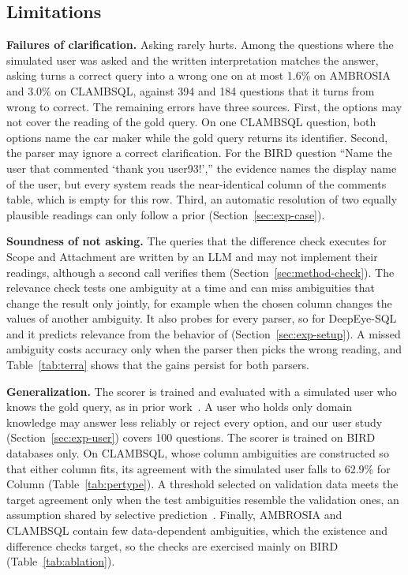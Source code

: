 \subsection{Limitations}
\label{sec:discussion}


\textbf{Failures of clarification.}\label{sec:exp-fail} Asking rarely
hurts. Among the questions where the simulated user was asked and the
written interpretation matches the answer, asking turns a correct
query into a wrong one on at most 1.6\% on AMBROSIA and 3.0\% on
CLAMBSQL, against 394 and 184 questions that it turns from wrong to
correct. The remaining errors have three sources. First, the options
may not cover the reading of the gold query. On one CLAMBSQL question,
both options name the car maker while the gold query returns its
identifier. Second, the parser may ignore a correct clarification. For
the BIRD question ``Name the user that commented `thank you
user93!','' the evidence names the display name of the user, but every
system reads the near-identical column of the comments table, which is
empty for this row. Third, an automatic resolution of two equally
plausible readings can only follow a prior
(Section~\ref{sec:exp-case}).

\textbf{Soundness of not asking.} The queries that the difference
check executes for Scope and Attachment are written by an LLM and may
not implement their readings, although a second call verifies them
(Section~\ref{sec:method-check}). The relevance check tests one
ambiguity at a time and can miss ambiguities that change the result
only jointly, for example when the chosen column changes the values of
another ambiguity. It also probes \coder{} for every parser, so for
DeepEye-SQL and \terra{} it predicts relevance from the behavior of
\coder{} (Section~\ref{sec:exp-setup}). A missed ambiguity costs
accuracy only when the parser then picks the wrong reading, and
Table~\ref{tab:terra} shows that the gains persist for both parsers.

\textbf{Generalization.} The scorer is trained and evaluated with a
simulated user who knows the gold query, as in prior
work~\cite{zhang2025clear,xu2026visinteract}. A user who holds only
domain knowledge may answer less reliably or reject every option, and
our user study (Section~\ref{sec:exp-user}) covers 100 questions.
The scorer is trained on BIRD databases only. On CLAMBSQL, whose
column ambiguities are constructed so that either column fits, its
agreement with the simulated user falls to 62.9\% for Column
(Table~\ref{tab:pertype}). A threshold selected on validation data
meets the target agreement only when the test ambiguities resemble
the validation ones, an assumption shared by selective
prediction~\cite{geifman2017selective,kamath2020selective}. Finally,
AMBROSIA and CLAMBSQL contain few data-dependent ambiguities, which
the existence and difference checks target, so the checks are
exercised mainly on BIRD (Table~\ref{tab:ablation}).

